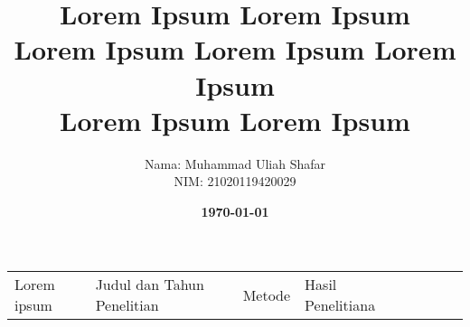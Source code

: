 \documentclass[12pt, landscape]{simrep} %
\title{
	\textbf{Lorem Ipsum Lorem Ipsum \\
		Lorem Ipsum Lorem Ipsum Lorem Ipsum} \\
	\textbf{{Lorem Ipsum Lorem Ipsum \\}}
} %
\date{\textbf{\today}}
\author{
	\begin{tabular}{@{}ll@{}}
		Nama  &  : Muhammad Uliah Shafar  \\
		NIM   &  : 21020119420029  \\
	\end{tabular}
}
\begin{document}

\begin{longtable}{|*{8}{l|}}
	Lorem ipsum & Judul dan Tahun Penelitian & Metode & Hasil Penelitiana &  &  &  & \\
\end{longtable}










\end{document}
